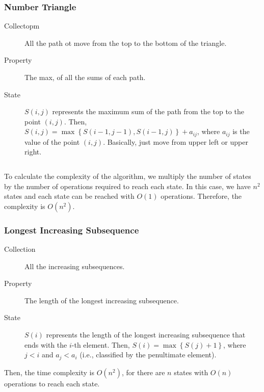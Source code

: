 \documentclass{article}
\begin{document}
\subsubsection{Number Triangle}

\begin{description}
	\item[Collectopm] All the path ot move from the top to the bottom of the triangle.
	\item[Property] The max, of all the sums of each path.
	\item[State] $S(i, j)$ represents the maximum sum of the path from the top to the point $(i, j)$. Then, $S(i, j) = \max \left\{S(i - 1, j - 1), S(i - 1, j)\right\} + a_{ij}$, where $a_{ij}$ is the value of the point $(i, j)$. Basically, just move from upper left or upper right.
\end{description}

\begin{center}
	\inputminted{cpp}{src/number-trig.cpp}
\end{center}

To calculate the complexity of the algorithm, we multiply the number of states by the number of operations required to reach each state. In this case, we have $n^2$ states and each state can be reached with $O(1)$ operations. Therefore, the complexity is $O(n^2)$.

\subsubsection{Longest Increasing Subsequence}

\begin{description}
	\item[Collection] All the increasing subsequences.
	\item[Property] The length of the longest increasing subsequence.
	\item[State] $S(i)$ represents the length of the longest increasing subsequence that ends with the $i$-th element. Then, $S(i) = \max \left\{S(j) + 1\right\}$, where $j < i$ and $a_j < a_i$ (i.e., classified by the penultimate element).
\end{description}

Then, the time complexity is $O(n^2)$, for there are $n$ states with $O(n)$ operations to reach each state.

\begin{center}
	\inputminted{cpp}{src/longest-increase-subsequence.cpp}
\end{center}
\end{document}
